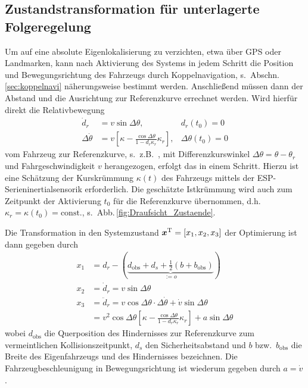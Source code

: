 \subsection{Zustandstransformation für unterlagerte Folgeregelung}
Um auf eine absolute Eigenlokalisierung zu verzichten, etwa über GPS oder Landmarken, %
kann nach Aktivierung des Systems in jedem Schritt die Position und Bewegungsrichtung des Fahrzeugs durch Koppelnavigation, s.\ Abschn.\,\ref{sec:koppelnavi} näherungsweise bestimmt werden. Anschließend müssen dann der Abstand und die Ausrichtung zur Referenzkurve errechnet werden. Wird hierfür direkt die Relativbewegung
\begin{subequations} \label{equ:relativbewegung}
\begin{align} 
	\!\!\!\!\!\! \dot d_r      &= v \sin\Delta\theta, &d_r(t_0) = 0 \label{equ:dgl_d_r_dot} \\
	\!\!\!\!\!\! \Delta\dot\theta &= v \left[\kappa  - \frac{\cos\Delta\theta}{1 - d_r \kappa_r} \kappa_r\right], &\Delta\theta(t_0) = 0 \label{equ:theta_r_dot} 
\end{align}
\end{subequations}
vom Fahrzeug zur Referenzkurve, s.\ z.B.\ \cite{werivcontrol08}, mit Differenzkurswinkel $\Delta\theta = \theta-\theta_r$ und Fahrgeschwindigkeit $v$ herangezogen, erfolgt das in einem Schritt. Hierzu ist eine Schätzung der Kurskrümmung $\kappa(t)$ des Fahrzeugs mittels der ESP-Serieninertialsensorik erforderlich. Die geschätzte Istkrümmung wird auch zum Zeitpunkt der Aktivierung $t_0$ für die Referenzkurve übernommen, d.h.\ $\kappa_r = \kappa(t_0) = \text{const.}$, s.\ Abb.\,\ref{fig:Draufsicht_Zustaende}.

Die Transformation in den Systemzustand $\boldsymbol{x}^{{\rm T}} = [x_1, x_2, x_3]$ der Optimierung ist dann gegeben durch
\begin{subequations} \label{equ:lin_stat_trafo}
\begin{align}
	x_1 &= d_r - (\underbrace{ d_\text{obs} + d_s + \tfrac{1}{2}( b + b_\text{obs} )}_{:= o})\label{equ:xi_1}
	\\
	x_2 &= \dot d_r = v  \sin\Delta\theta \label{equ:xi_2} \\
\nonumber
	x_3 &= \ddot d_r = v \cos\Delta\theta \cdot \Delta\dot\theta + \dot v \sin\Delta\theta \\
	&=  v^2 \cos\Delta\theta\left[\kappa  - \frac{\cos\Delta\theta}{1 - d_r \kappa_r} \kappa_r\right] + a \sin\Delta\theta \label{equ:xi_3}
\end{align}
\end{subequations}
wobei $d_\text{obs}$ die Querposition des Hindernisses zur Referenzkurve zum vermeintlichen Kollisionszeitpunkt, $d_s$ den  Sicherheitsabstand und $b$ bzw.\ $b_\text{obs}$ die Breite des Eigenfahrzeugs und des Hindernisses bezeichnen. Die Fahrzeugbeschleunigung in Bewegungsrichtung ist wiederum gegeben durch $a = \dot v$.

